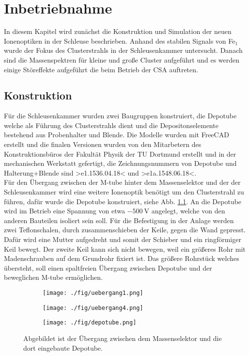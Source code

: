 \chapter{Inbetriebnahme}
\label{sec:inbetriebnahme}
In diesem Kapitel wird zunächst die Konstruktion und Simulation der neuen Ionenoptiken in der Schleuse beschrieben.
Anhand des stabilen Signals von Fe$_1$ wurde der Fokus des Clusterstrahls in der Schleusenkammer untersucht.
Danach sind die Massenspektren für kleine und große Cluster aufgeführt und es werden einige Störeffekte aufgeführt die beim Betrieb der CSA auftreten.
\section{Konstruktion}
Für die Schleusenkammer wurden zwei Baugruppen konstruiert, die Depotube welche als Führung des Clusterstrahls dient und die Depositonselemente bestehend aus Probenhalter und Blende. Die Modelle wurden mit FreeCAD\cite{freecad} erstellt und die finalen Versionen wurden von den Mitarbetern des Konstruktionsbüros der Fakultät Physik der TU Dortmund erstellt \cite{konstruktion} und in der mechanischen Werkstatt gefertigt, die Zeichnungsnummern von Depotube und Halterung+Blende sind >e1.1536.04.18< und >e1a.1548.06.18<.\\

Für den Übergang zwischen der M-tube hinter dem Massenselektor und der der Schleusenkammer wird eine weitere Ionenoptik benötigt um den Clusterstrahl zu führen, dafür wurde die Depotube konstruiert, siehe Abb. \ref{fig:depotube}.
An die Depotube wird im Betrieb eine Spannung von etwa $\SI{-500}{\volt}$ angelegt, welche von den anderen Bauteilen isoliert sein soll.
Für die Befestigung in der Anlage werden zwei Teflonschalen, durch zusammenschieben der Keile, gegen die Wand gepresst.
Dafür wird eine Mutter aufgedreht und somit der Schieber und ein ringförmiger Keil bewegt.
Der zweite Keil kann sich nicht bewegen, weil ein größeres Rohr mit Madenschrauben auf dem Grundrohr fixiert ist.
Das größere Rohrstück welches übersteht, soll einen spaltfreien Übergang zwischen Depotube und der beweglichen M-tube ermöglichen.

\begin{figure}
  \begin{subfigure}[h]{1\textwidth}
    \texttt{[image: ./fig/uebergang1.png]}
  \end{subfigure}\hfill
  \begin{subfigure}[h]{1\textwidth}
    \texttt{[image: ./fig/uebergang4.png]}
  \end{subfigure}\hfill
  \begin{subfigure}[h]{1\textwidth}
    \texttt{[image: ./fig/depotube.png]}
  \end{subfigure}
  \caption{Abgebildet ist der Übergang zwischen dem Massenselektor und die dort eingebaute Depotube.}
  \label{fig:depotube}
\end{figure}

